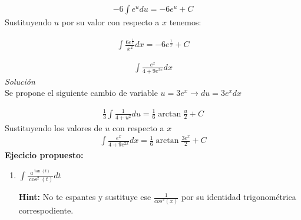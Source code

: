 \begin{equation*}
    \begin{gathered}
        -6\int e^{u}du = -6 e^{u} + C 
    \end{gathered}
\end{equation*}
Sustituyendo \(\displaystyle u\) por su valor con respecto a \(\displaystyle x\) tenemos:

\begin{equation*}
    \begin{gathered}
        \int \frac{6 e^{\frac{1}{x}}}{x^{2}}dx=-6 e^{\frac{1}{x}} + C
    \end{gathered}
\end{equation*}

\vspace{1cm}
\begin{equation}
    \begin{gathered}
        \int\frac{e^{x}}{4 + 9 e^{2x}}dx
    \end{gathered}
\end{equation}
\textit{Solución}\\
Se propone el siguiente cambio de variable \(\displaystyle u=3e^{x}\rightarrow du= 3e^{x}dx\)

\begin{equation*}
    \begin{gathered}
        \frac{1}{3}\int \frac{1}{4+u^{2}}du=\frac{1}{6}\arctan{\frac{u}{2}}+C
    \end{gathered}
\end{equation*}
Sustituyendo los valores de \(\displaystyle u \) con respecto a \(\displaystyle x\)
\begin{equation*}
    \begin{gathered}
        \int\frac{e^{x}}{4 + 9 e^{2x}}dx = \frac{1}{6}\arctan{\frac{3e^{x}}{2}}+C
    \end{gathered}
\end{equation*}
\textbf{Ejecicio propuesto:}\\
\begin{enumerate}
  \item \(\displaystyle\int \frac{a^{\tan(t)}}{\cos^{2}(t)}dt\)
    
  \textbf{Hint:} No te espantes y sustituye ese \(\displaystyle\frac{1}{cos^{2}(x)}\) por su identidad trigonométrica correspodiente.
\end{enumerate}
\clearpage